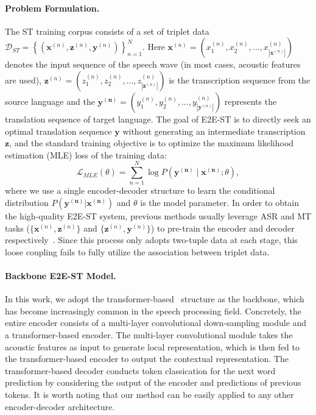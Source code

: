 \documentclass[letterpaper]{article} %
\begin{document}
\paragraph{Problem Formulation.}
The ST training corpus consists of a set of triplet
data $\mathcal{D}_{ST}=\left\{(\mathbf{x}^{(n)}, \mathbf{z}^{(n)}, \mathbf{y}^{(n)})\right\}_{n=1}^{N}$.
Here $\mathbf{x}^{(n)}=(x_1^{(n)}, x_2^{(n)},...,x_{|\mathbf{x}^{(n)}|}^{(n)})$ denotes the input sequence of the speech wave (in most cases, acoustic features are used), $\mathbf{z}^{(n)}=(z_1^{(n)},z_2^{(n)},...,z_{|\mathbf{z}^{(n)}|}^{(n)})$ is the transcription sequence from the source language and the $\mathbf{y^{(n)}}=(y_1^{(n)}, y_2^{(n)},...,y_{|\mathbf{y}^{(n)}|}^{(n)})$ represents the translation sequence of target language. 
The goal of E2E-ST is to directly seek an optimal translation sequence $\mathbf{y}$ without generating an intermediate transcription $\mathbf{z}$, and the standard training objective is to optimize the maximum likelihood estimation (MLE) loss of the training data:
\begin{equation}
    \mathcal{L}_{MLE}(\theta)=\sum_{n=1}^{N} \log P\left(\mathbf{y^{(n)}}  \mid \mathbf{x^{(n)}} ; \theta\right),
    \label{eq:vanilla_st}
\end{equation}
where we use a single encoder-decoder structure to learn the conditional distribution $P(\mathbf{y^{(n)}}|\mathbf{x^{(n)}})$ and $\theta$ is the model parameter. 
In order to obtain the high-quality E2E-ST system, previous methods usually leverage ASR and MT tasks ($\{\mathbf{x}^{(n)}, \mathbf{z}^{(n)}\}$ and $\{\mathbf{z}^{(n)}, \mathbf{y}^{(n)}\}$) to pre-train the encoder and decoder respectively~\cite{Bansal2019PretrainingOH, Wang2020BridgingTG, Wang2020CurriculumPF}.
Since this process only adopts two-tuple data at each stage, this loose coupling fails to fully utilize the association between triplet data.
 
\paragraph{Backbone E2E-ST Model.}
In this work, we adopt the transformer-based~\cite{Vaswani2017AttentionIA} structure as the backbone, which has become increasingly common in the speech processing field.
Concretely, the entire encoder consists of a multi-layer convolutional down-sampling module and a transformer-based encoder. 
The multi-layer convolutional module takes the acoustic features as input to generate local representation, which is then fed to the transformer-based encoder to output the contextual representation.   
The transformer-based decoder conducts token classication for the next word prediction by considering the output of the encoder and predictions of previous tokens. 
It is worth noting that our method can be easily applied to any other encoder-decoder architecture.
\end{document}
